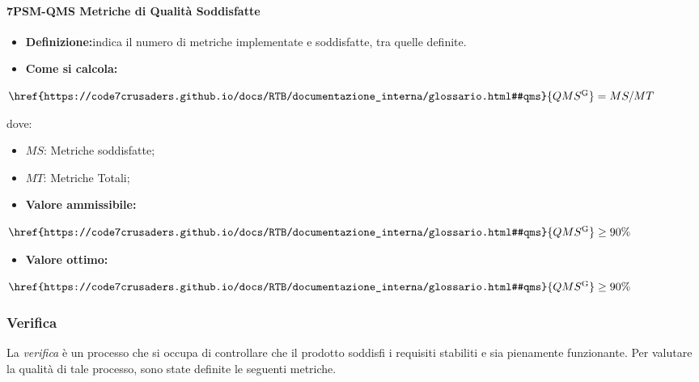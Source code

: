 \paragraph*{7PSM-QMS Metriche di Qualità Soddisfatte}
\begin{itemize}
    \item \textbf{Definizione:}indica il numero di metriche implementate e soddisfatte, tra quelle definite.
    \item \textbf{Come si calcola:}
\end{itemize}
\begin{center}
    $\href{https://code7crusaders.github.io/docs/RTB/documentazione_interna/glossario.html#qms}{QMS\textsuperscript{G}} = MS/MT$ 
 \end{center}
 dove:
 \begin{itemize}[label=$\rightarrow$]
     \item $MS$: Metriche soddisfatte;
     \item $MT$: Metriche Totali;
 \end{itemize}
\begin{itemize}
    \item \textbf{Valore ammissibile:}
\end{itemize}
\begin{center}
    $\href{https://code7crusaders.github.io/docs/RTB/documentazione_interna/glossario.html#qms}{QMS\textsuperscript{G}} \geq 90\%$
\end{center}
\begin{itemize}
    \item \textbf{Valore ottimo:}
\end{itemize}
\begin{center}
    $\href{https://code7crusaders.github.io/docs/RTB/documentazione_interna/glossario.html#qms}{QMS\textsuperscript{G}} \geq 90\%$
\end{center}

\subsubsection{Verifica}
La \emph{verifica} è un processo che si occupa di controllare che il prodotto soddisfi i requisiti
stabiliti e sia pienamente funzionante. Per valutare la qualità di tale processo, sono state
definite le seguenti metriche.

